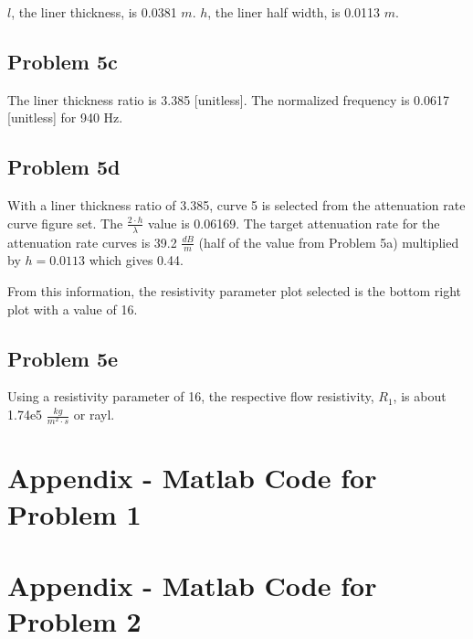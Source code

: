 {{{{$l$, the liner thickness, is 0.0381 $m$.  $h$, the liner half width, is 0.0113 $m$.


\subsection*{Problem 5c}

The liner thickness ratio is 3.385 [unitless].  The normalized frequency is 0.0617 [unitless] for 940 Hz.


\subsection*{Problem 5d}

With a liner thickness ratio of 3.385, curve 5 is selected from the attenuation rate curve figure set. The $\frac{2 \cdot h}{\lambda}$ value is 0.06169.  The target attenuation rate for the attenuation rate curves is 39.2 $\frac{dB}{m}$ (half of the value from Problem 5a) multiplied by $h = 0.0113$ which gives 0.44.

From this information, the resistivity parameter plot selected is the bottom right plot with a value of 16.


\subsection*{Problem 5e}

Using a resistivity parameter of 16, the respective flow resistivity, $R_1$, is about 1.74e5 $\frac{kg}{m^2 \cdot s}$ or rayl.






\newpage
\section{Appendix - Matlab Code for Problem 1}
\label{appendix:problem1}





\newpage
\section{Appendix - Matlab Code for Problem 2}
\label{appendix:problem2}





}}}}
